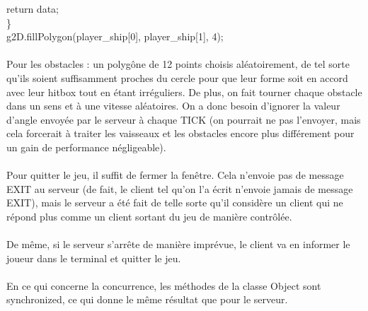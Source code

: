 \documentclass{article}
\begin{document}
  return data;\\
\}\\
g2D.fillPolygon(player\_ship[0], player\_ship[1], 4);\\
\\
Pour les obstacles : un polygône de 12 points choisis aléatoirement, de tel sorte qu'ils soient suffisamment proches du cercle pour que leur forme
soit en accord avec leur hitbox tout en étant irréguliers. De plus, on fait tourner chaque obstacle dans un sens et à une vitesse aléatoires. On a donc besoin
d'ignorer la valeur d'angle envoyée par le serveur à chaque TICK (on pourrait ne pas l'envoyer, mais cela forcerait à traiter les vaisseaux et les obstacles encore plus
différement pour un gain de performance négligeable).\\
\\
Pour quitter le jeu, il suffit de fermer la fenêtre. Cela n'envoie pas de message EXIT au serveur (de fait, le client tel qu'on l'a écrit n'envoie jamais de message EXIT),
mais le serveur a été fait de telle sorte qu'il considère un client qui ne répond plus comme un client sortant du jeu de manière contrôlée.\\
\\
De même, si le serveur s'arrête de manière imprévue, le client va en informer le joueur dans le terminal et quitter le jeu.\\
\\
En ce qui concerne la concurrence, les méthodes de la classe Object sont synchronized, ce qui donne le même résultat que pour le serveur.
\end{document}

